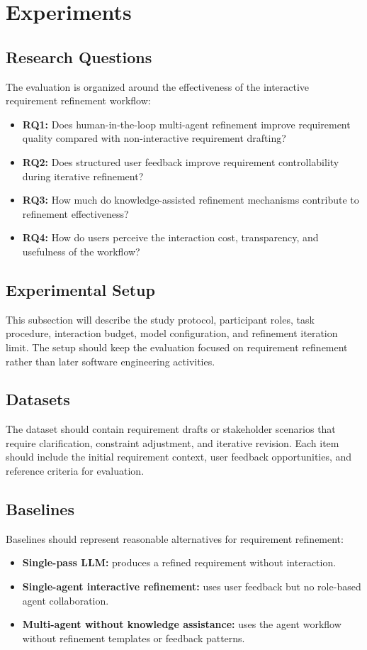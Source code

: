 \section{Experiments}
\label{experiments}

\subsection{Research Questions}
\label{subsec:exp-rqs}
The evaluation is organized around the effectiveness of the interactive requirement refinement workflow:
\begin{itemize}[leftmargin=*]
  \item \textbf{RQ1:} Does human-in-the-loop multi-agent refinement improve requirement quality compared with non-interactive requirement drafting?
  \item \textbf{RQ2:} Does structured user feedback improve requirement controllability during iterative refinement?
  \item \textbf{RQ3:} How much do knowledge-assisted refinement mechanisms contribute to refinement effectiveness?
  \item \textbf{RQ4:} How do users perceive the interaction cost, transparency, and usefulness of the workflow?
\end{itemize}

\subsection{Experimental Setup}
\label{subsec:exp-setup}
This subsection will describe the study protocol, participant roles, task procedure, interaction budget, model configuration, and refinement iteration limit. The setup should keep the evaluation focused on requirement refinement rather than later software engineering activities.

\subsection{Datasets}
\label{subsec:exp-datasets}
The dataset should contain requirement drafts or stakeholder scenarios that require clarification, constraint adjustment, and iterative revision. Each item should include the initial requirement context, user feedback opportunities, and reference criteria for evaluation.

\subsection{Baselines}
\label{subsec:exp-baselines}
Baselines should represent reasonable alternatives for requirement refinement:
\begin{itemize}[leftmargin=*]
  \item \textbf{Single-pass LLM:} produces a refined requirement without interaction.
  \item \textbf{Single-agent interactive refinement:} uses user feedback but no role-based agent collaboration.
  \item \textbf{Multi-agent without knowledge assistance:} uses the agent workflow without refinement templates or feedback patterns.
\end{itemize}

